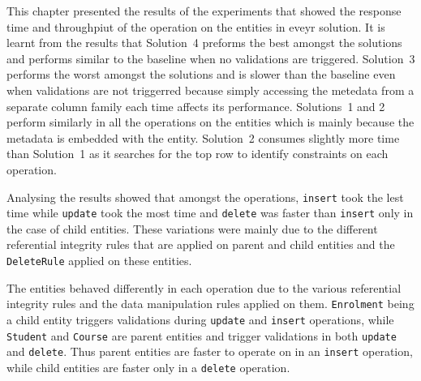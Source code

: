 This chapter presented the results of the experiments that showed the response
time and throughpiut of the operation on the entities in eveyr solution. It is
learnt from the results that Solution~4 preforms the best amongst the solutions
and performs similar to the baseline when no validations are triggered.
Solution~3 performs the worst amongst the solutions and is slower than the
baseline even when validations are not triggerred because simply accessing the
metedata from a separate column family each time affects its performance.
Solutions~1 and 2 perform similarly in all the operations on the entities which
is mainly because the metadata is embedded with the entity. Solution~2 consumes
slightly more time than Solution~1 as it searches for the top row to identify
constraints on each operation. 

Analysing the results showed that amongst the operations, \texttt{insert} took
the lest time while \texttt{update} took the most time and \texttt{delete} was
faster than \texttt{insert} only in the case of child entities. These variations
were mainly due to the different referential integrity rules that are applied
on parent and child entities and the \texttt{DeleteRule} applied on these
entities.

The entities behaved differently in each operation due to the various
referential integrity rules and the data manipulation rules applied on them.
\texttt{Enrolment} being a child entity triggers validations during
\texttt{update} and \texttt{insert} operations, while \texttt{Student} and
\texttt{Course} are parent entities and trigger validations in both
\texttt{update} and \texttt{delete}. Thus parent entities are faster to operate
on in an \texttt{insert} operation, while child entities are faster only in a
\texttt{delete} operation. 
	